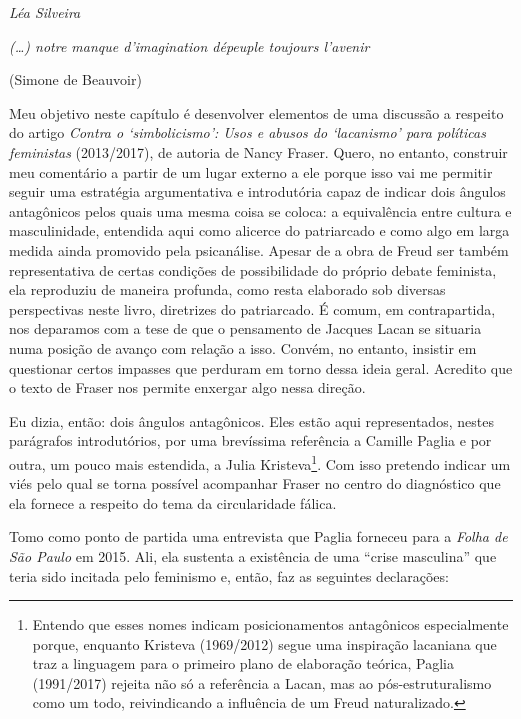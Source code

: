 

\begin{flushright}
\emph{Léa Silveira}
\end{flushright}

\epigraph{\emph{(\ldots{}) notre manque d'imagination dépeuple toujours l'avenir}}{(Simone de Beauvoir)}

Meu objetivo neste capítulo é desenvolver elementos de uma discussão a
respeito do artigo \emph{Contra o `simbolicismo': Usos e abusos do
`lacanismo' para políticas feministas} (2013/2017), de autoria de Nancy
Fraser. Quero, no entanto, construir meu comentário a partir de um lugar
externo a ele porque isso vai me permitir seguir uma estratégia
argumentativa e introdutória capaz de indicar dois ângulos antagônicos
pelos quais uma mesma coisa se coloca: a equivalência entre cultura e
masculinidade, entendida aqui como alicerce do patriarcado e como algo
em larga medida ainda promovido pela psicanálise. Apesar de a obra de
Freud ser também representativa de certas condições de possibilidade do
próprio debate feminista, ela reproduziu de maneira profunda, como resta
elaborado sob diversas perspectivas neste livro, diretrizes do
patriarcado. É comum, em contrapartida, nos deparamos com a tese de que
o pensamento de Jacques Lacan se situaria numa posição de avanço com
relação a isso. Convém, no entanto, insistir em questionar certos
impasses que perduram em torno dessa ideia geral. Acredito que o texto
de Fraser nos permite enxergar algo nessa direção.

Eu dizia, então: dois ângulos antagônicos. Eles estão aqui
representados, nestes parágrafos introdutórios, por uma brevíssima
referência a Camille Paglia e por outra, um pouco mais estendida, a
Julia Kristeva\footnote{Entendo que esses nomes indicam posicionamentos
  antagônicos especialmente porque, enquanto Kristeva (1969/2012) segue
  uma inspiração lacaniana que traz a linguagem para o primeiro plano de
  elaboração teórica, Paglia (1991/2017) rejeita não só a referência a
  Lacan, mas ao pós-estruturalismo como um todo, reivindicando a
  influência de um Freud naturalizado.}. Com isso pretendo indicar um
viés pelo qual se torna possível acompanhar Fraser no centro do
diagnóstico que ela fornece a respeito do tema da circularidade fálica.

Tomo como ponto de partida uma entrevista que Paglia forneceu para a
\emph{Folha de São Paulo} em 2015. Ali, ela sustenta a existência de uma
``crise masculina'' que teria sido incitada pelo feminismo e, então, faz
as seguintes declarações:


